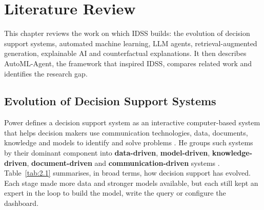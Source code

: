 \chapter{Literature Review}\label{ch:2}

This chapter reviews the work on which IDSS builds: the evolution of decision support systems, automated machine learning, LLM agents, retrieval-augmented generation, explainable AI and counterfactual explanations. It then describes AutoML-Agent, the framework that inspired IDSS, compares related work and identifies the research gap.

\FloatBarrier
\section{Evolution of Decision Support Systems}\label{sec:2.1}

Power defines a decision support system as an interactive computer-based system that helps decision makers use communication technologies, data, documents, knowledge and models to identify and solve problems \cite{ref1}. He groups such systems by their dominant component into \textbf{data-driven}, \textbf{model-driven}, \textbf{knowledge-driven}, \textbf{document-driven} and \textbf{communication-driven} systems \cite{ref1}. Table~\ref{tab:2.1} summarises, in broad terms, how decision support has evolved. Each stage made more data and stronger models available, but each still kept an expert in the loop to build the model, write the query or configure the dashboard.

